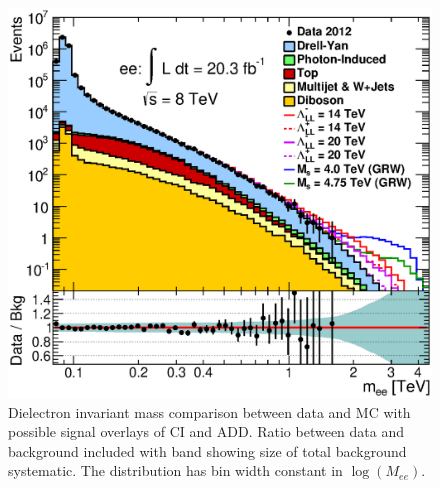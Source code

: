 	\begin{figure}[h]
	    \begin{center}
	    	\includegraphics[width=0.8\linewidth]{images/invmass_main.eps}
	    \end{center}
	   \caption{Dielectron invariant mass comparison between data and MC with possible signal overlays of CI and ADD. Ratio between data and background included with band showing size of total background systematic. The distribution has bin width constant in $\log(M_{ee})$.}
	   \label{fig:invMass_main}
	\end{figure}

